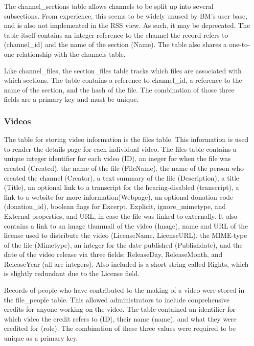 \documentclass[a4paper,12pt]{report}
\begin{document}
The channel\_sections table allows channels to be split up into several subsections. From experience, this seems to be widely unused by BM's user base, and is also not implemented in the RSS view. As such, it may be deprecated. The table itself contains an integer reference to the channel the record refers to (channel\_id) and the name of the section (Name). The table also shares a one-to-one relationship with the channels table.


Like channel\_files, the section\_files table tracks which files are associated with which sections. The table contains a reference to channel\_id, a reference to the name of the section, and the hash of the file. The combination of those three fields are a primary key and must be unique.


\subsubsection{Videos}
The table for storing video information is the files table. This information is used to render the details page for each individual video. The files table contains a unique integer identifier for each video (ID), an ineger for when the file was created (Created), the name of the file (FileName), the name of the person who created the channel (Creator), a text summary of the file (Description), a title (Title), an optional link to a transcript for the hearing-disabled (transcript), a link to a website for more information(Webpage), an optional donation code (donation\_id), boolean flags for Excerpt, Explicit, ignore\_mimetype, and External properties, and URL, in case the file was linked to externally. It also contains a link to an image thumnail of the video (Image), name and URL of the license used to distribute the video (LicenseName, LicenseURL), the MIME-type of the file (Mimetype), an integer for the date published (Publishdate), and the date of the video release via three fields: ReleaseDay, ReleaseMonth, and ReleaseYear (all are integers). Also included is a short string called Rights, which is slightly redundant due to the License field. 


Records of people who have contributed to the making of a video were stored in the file\_people table. This allowed administrators to include conprehensive credits for anyone working on the video. The table contained an identifier for which video the credit refers to (ID), their name (name), and what they were credited for (role). The combination of these three values were required to be unique as a primary key.
\end{document}
